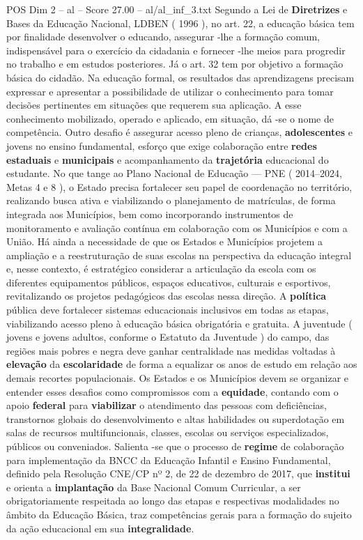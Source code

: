 \begin{textsample}{POS Dim 2 – al – Score 27.00 – al/al\_inf\_3.txt}
Segundo a Lei de \textbf{Diretrizes} e Bases da Educação Nacional, LDBEN ( 1996 ), no art. 22, a educação básica tem por finalidade desenvolver o educando, assegurar -lhe a formação comum, indispensável para o exercício da cidadania e fornecer -lhe meios para progredir no trabalho e em estudos posteriores.
Já o art. 32 tem por objetivo a formação básica do cidadão.
Na educação formal, os resultados das aprendizagens precisam expressar e apresentar a possibilidade de utilizar o conhecimento para tomar decisões pertinentes em situações que requerem sua aplicação.
A esse conhecimento mobilizado, operado e aplicado, em situação, dá -se o nome de competência.
Outro desafio é assegurar acesso pleno de crianças, \textbf{adolescentes} e jovens no ensino fundamental, esforço que exige colaboração entre \textbf{redes} \textbf{estaduais} e \textbf{municipais} e acompanhamento da \textbf{trajetória} educacional do estudante.
No que tange ao Plano Nacional de Educação — PNE ( 2014–2024, Metas 4 e 8 ), o Estado precisa fortalecer seu papel de coordenação no território, realizando busca ativa e viabilizando o planejamento de matrículas, de forma integrada aos Municípios, bem como incorporando instrumentos de monitoramento e avaliação contínua em colaboração com os Municípios e com a União.
Há ainda a necessidade de que os Estados e Municípios projetem a ampliação e a reestruturação de suas escolas na perspectiva da educação integral e, nesse contexto, é estratégico considerar a articulação da escola com os diferentes equipamentos públicos, espaços educativos, culturais e esportivos, revitalizando os projetos pedagógicos das escolas nessa direção.
A \textbf{política} pública deve fortalecer sistemas educacionais inclusivos em todas as etapas, viabilizando acesso pleno à educação básica obrigatória e gratuita.
A juventude ( jovens e jovens adultos, conforme o Estatuto da Juventude ) do campo, das regiões mais pobres e negra deve ganhar centralidade nas medidas voltadas à \textbf{elevação} da \textbf{escolaridade} de forma a equalizar os anos de estudo em relação aos demais recortes populacionais.
Os Estados e os Municípios devem se organizar e entender esses desafios como compromissos com a \textbf{equidade}, contando com o apoio \textbf{federal} para \textbf{viabilizar} o atendimento das pessoas com deficiências, transtornos globais do desenvolvimento e altas habilidades ou superdotação em salas de recursos multifuncionais, classes, escolas ou serviços especializados, públicos ou conveniados.
Salienta -se que o processo de \textbf{regime} de colaboração para implementação da BNCC da Educação Infantil e Ensino Fundamental, definido pela Resolução CNE/CP nº 2, de 22 de dezembro de 2017, que \textbf{institui} e orienta a \textbf{implantação} da Base Nacional Comum Curricular, a ser obrigatoriamente respeitada ao longo das etapas e respectivas modalidades no âmbito da Educação Básica, traz competências gerais para a formação do sujeito da ação educacional em sua \textbf{integralidade}.

\end{textsample}
